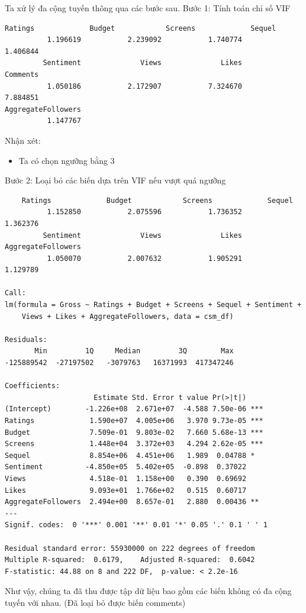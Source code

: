 Ta xử lý đa cộng tuyến thông qua các bước sau. Bước 1: Tính toán chỉ số VIF
\begin{lstlisting}
Ratings             Budget            Screens             Sequel 
          1.196619           2.239092           1.740774           1.406844 
         Sentiment              Views              Likes           Comments 
          1.050186           2.172907           7.324670           7.884851 
AggregateFollowers 
          1.147767 
\end{lstlisting}
Nhận xét:
\begin{itemize}
    \item Ta có chọn ngưỡng bằng 3
\end{itemize}
Bước 2: Loại bỏ các biến dựa trên VIF nếu vượt quá ngưỡng
\begin{lstlisting}
    Ratings             Budget            Screens             Sequel 
          1.152850           2.075596           1.736352           1.362376 
         Sentiment              Views              Likes AggregateFollowers 
          1.050070           2.007632           1.905291           1.129789 

Call:
lm(formula = Gross ~ Ratings + Budget + Screens + Sequel + Sentiment + 
    Views + Likes + AggregateFollowers, data = csm_df)

Residuals:
       Min         1Q     Median         3Q        Max 
-125889542  -27197502   -3079763   16371993  417347246 

Coefficients:
                     Estimate Std. Error t value Pr(>|t|)    
(Intercept)        -1.226e+08  2.671e+07  -4.588 7.50e-06 ***
Ratings             1.590e+07  4.005e+06   3.970 9.73e-05 ***
Budget              7.509e-01  9.803e-02   7.660 5.68e-13 ***
Screens             1.448e+04  3.372e+03   4.294 2.62e-05 ***
Sequel              8.854e+06  4.451e+06   1.989  0.04788 *  
Sentiment          -4.850e+05  5.402e+05  -0.898  0.37022    
Views               4.518e-01  1.158e+00   0.390  0.69692    
Likes               9.093e+01  1.766e+02   0.515  0.60717    
AggregateFollowers  2.494e+00  8.657e-01   2.880  0.00436 ** 
---
Signif. codes:  0 '***' 0.001 '**' 0.01 '*' 0.05 '.' 0.1 ' ' 1

Residual standard error: 55930000 on 222 degrees of freedom
Multiple R-squared:  0.6179,	Adjusted R-squared:  0.6042 
F-statistic: 44.88 on 8 and 222 DF,  p-value: < 2.2e-16
\end{lstlisting}
Như vậy, chúng ta đã thu được tập dữ liệu bao gồm các biến không có đa cộng tuyến với nhau. (Đã loại bỏ được biến comments)

